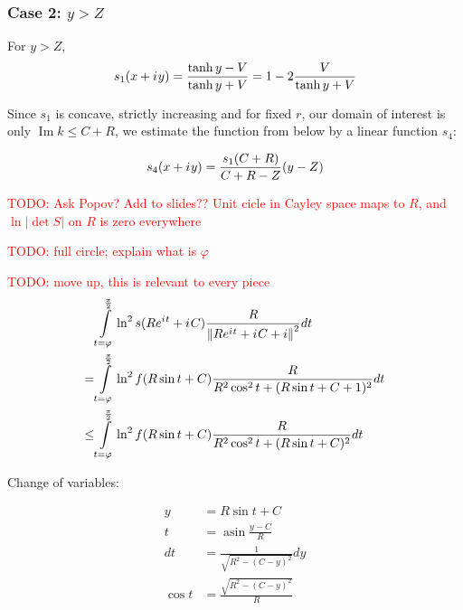 \documentclass[12pt, a4paper]{article}
\newcommand{\abs}[1]{\left| #1 \right|}
\newcommand{\norm}[1]{\left\lVert #1 \right\rVert}
\newcommand{\eexp}[1]{e^{#1}}
\newcommand{\iu}{{i\mkern1mu}}
\renewcommand{\Im}{\operatorname{Im}}
\renewcommand{\phi}{\varphi}
\newcommand{\todo}[1]{{\large \textcolor{red}{TODO: #1}}}
\DeclareMathOperator\asin{asin}
\begin{document}
\subsubsection*{Case 2: $y > Z$}
For $y > Z$, 
\[
s_1(x + \iu y) 
 = \frac{\tanh y - V}{\tanh y + V}
 = 1 - 2 \frac{V}{\tanh y + V}
\]

Since $s_1$ is concave, strictly increasing and for fixed $r$, our domain of interest is only $\Im k \le C + R$, we estimate the function from below by a linear function $s_4$:

\[
s_4(x + \iu y) = 
\frac{s_1(C + R)}{C + R - Z} (y - Z)
\]

\todo{Ask Popov? Add to slides?? Unit cicle in Cayley space maps to $R$, and $\ln\abs{\det S}$ on $R$ is zero everywhere}




\todo{full circle; explain what is $\phi$}

\todo{move up, this is relevant to every piece}
\begin{align*}
    & \int\limits_{t = \phi}^{\frac{\pi}{2}} \ln^2 s(R \eexp{\iu t} + \iu C) \frac{R}{\norm{R \eexp{\iu t} + \iu C + i}^2} dt\\
=   & \int\limits_{t = \phi}^{\frac{\pi}{2}} \ln^2 f(R \sin t + C) \frac{R}{R^2 \cos^2 t + (R \sin t + C + 1)^2} dt\\
\le & \int\limits_{t = \phi}^{\frac{\pi}{2}} \ln^2 f(R \sin t + C) \frac{R}{R^2 \cos^2 t + (R \sin t + C)^2} dt\\
\end{align*}


Change of variables:

\begin{align*}
y &= R \sin t + C \\
t &= \asin \frac{y - C}{R} \\
dt &= \frac{1}{\sqrt{R^2 - (C - y)^2}} dy \\
\cos t &= \frac{\sqrt{R^2 - (C - y)^2}}{R}
\end{align*}
\end{document}
